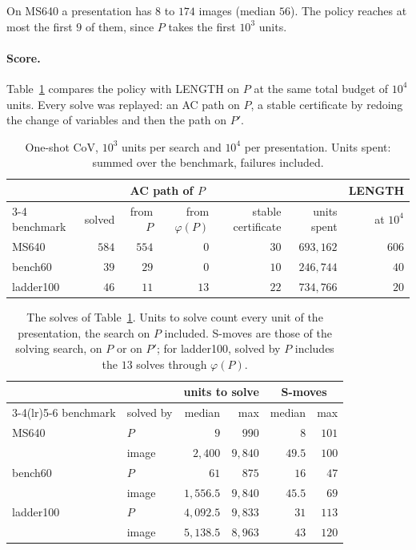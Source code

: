 On MS640 a presentation has $8$ to $174$ images (median $56$). The policy reaches at most the first $9$ of them, since
$P$ takes the first $10^3$ units.

\paragraph{Score.} Table~\ref{tab:cov_oneshot} compares the policy with LENGTH on $P$ at the same total budget of
$10^4$ units. Every solve was replayed: an AC path on $P$, a stable certificate by redoing the change of variables and
then the path on $P'$.

\begin{table}[ht]
\centering
\small
\begin{tabular}{lrrrrrr}
\toprule
& & \multicolumn{2}{c}{AC path of $P$} & & & LENGTH\\
\cmidrule(lr){3-4}
benchmark & solved & from $P$ & from $\varphi(P)$ & stable certificate & units spent & at $10^4$\\
\midrule
MS640 & $584$ & $554$ & $0$ & $30$ & $693{,}162$ & $606$\\
bench60 & $39$ & $29$ & $0$ & $10$ & $246{,}744$ & $40$\\
ladder100 & $46$ & $11$ & $13$ & $22$ & $734{,}766$ & $20$\\
\bottomrule
\end{tabular}
\caption{One-shot CoV, $10^3$ units per search and $10^4$ per presentation. Units spent: summed over the benchmark,
failures included.}
\label{tab:cov_oneshot}
\end{table}

\begin{table}[ht]
\centering
\small
\begin{tabular}{llrrrr}
\toprule
& & \multicolumn{2}{c}{units to solve} & \multicolumn{2}{c}{S-moves}\\
\cmidrule(lr){3-4}\cmidrule(lr){5-6}
benchmark & solved by & median & max & median & max\\
\midrule
MS640 & $P$ & $9$ & $990$ & $8$ & $101$\\
& image & $2{,}400$ & $9{,}840$ & $49.5$ & $100$\\
bench60 & $P$ & $61$ & $875$ & $16$ & $47$\\
& image & $1{,}556.5$ & $9{,}840$ & $45.5$ & $69$\\
ladder100 & $P$ & $4{,}092.5$ & $9{,}833$ & $31$ & $113$\\
& image & $5{,}138.5$ & $8{,}963$ & $43$ & $120$\\
\bottomrule
\end{tabular}
\caption{The solves of Table~\ref{tab:cov_oneshot}. Units to solve count every unit of the presentation, the search on
$P$ included. S-moves are those of the solving search, on $P$ or on $P'$; for ladder100, solved by $P$ includes the
$13$ solves through $\varphi(P)$.}
\label{tab:cov_oneshot_cost}
\end{table}

